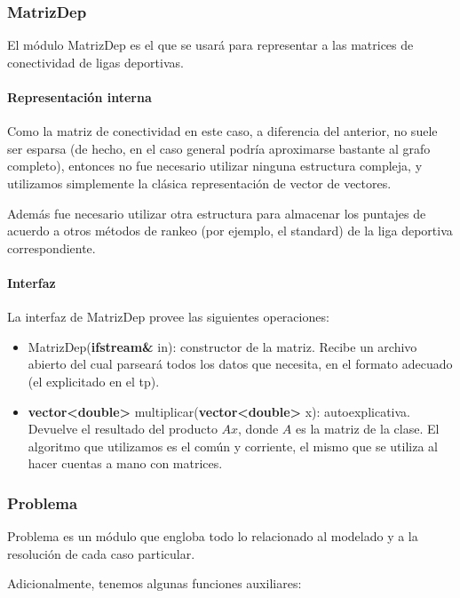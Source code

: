 \subsubsection{MatrizDep}
El módulo MatrizDep es el que se usará para representar a las matrices de conectividad de ligas deportivas.

\paragraph{Representación interna}

Como la matriz de conectividad en este caso, a diferencia del anterior, no suele ser esparsa (de hecho, en el caso general podría aproximarse bastante al grafo completo), entonces no fue necesario utilizar ninguna estructura compleja, y utilizamos simplemente la clásica representación de vector de vectores.

Además fue necesario utilizar otra estructura para almacenar los puntajes de acuerdo a otros métodos de rankeo (por ejemplo, el standard) de la liga deportiva correspondiente.

\paragraph{Interfaz}

La interfaz de MatrizDep provee las siguientes operaciones:
\begin{itemize}
    \item MatrizDep(\textbf{ifstream\&} in): constructor de la matriz. Recibe un archivo abierto del cual parseará todos los datos que necesita, en el formato adecuado (el explicitado en el tp).

    \item \textbf{vector<double>} multiplicar(\textbf{vector<double>} x): autoexplicativa. Devuelve el resultado del producto $Ax$, donde $A$ es la matriz de la clase. El algoritmo que utilizamos es el común y corriente, el mismo que se utiliza al hacer cuentas a mano con matrices.
\end{itemize}




\subsubsection{Problema}
Problema es un módulo que engloba todo lo relacionado al modelado y a la resolución de cada caso particular.


Adicionalmente, tenemos algunas funciones auxiliares: 

